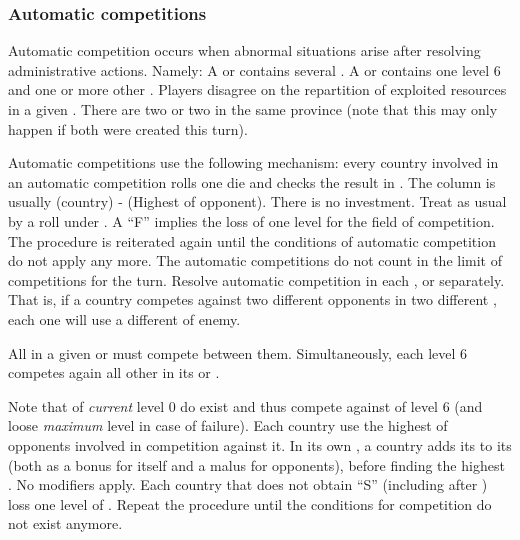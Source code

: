 \subsubsection{Automatic competitions}
\label{chExpenses:Automatic Competition}
\aparag[Conditions] Automatic competition occurs when abnormal situations
arise after resolving administrative actions. Namely:
\bparag A \STZ or \CTZ contains several \TradeFLEET\faceplus.
\bparag A \STZ or \CTZ contains one level 6 \TradeFLEET and one or more other
\TradeFLEET.
\bparag Players disagree on the repartition of exploited resources in a given
\Area.
\bparag There are two \COL or two \TP in the same province (note that this may
only happen if both were created this turn).

\aparag[Mechanism] Automatic competitions use the following mechanism: every
country involved in an automatic competition rolls one die and checks the
result in .
\bparag The column is usually (\FTI country) - (Highest \FTI of
opponent). There is no investment.
\bparag Treat \undemi as usual by a roll under \FTI.
\bparag A ``F'' implies the loss of one level for the field of competition.
\bparag The procedure is reiterated again until the conditions of automatic
competition do not apply any more.
\bparag The automatic competitions do not count in the limit of competitions
for the turn.
\bparag Resolve automatic competition in each \STZ, \CTZ or \Area
separately. That is, if a country competes against two different opponents in
two different \STZ, each one will use a different \FTI of enemy.

\aparag[Fleets]\label{chExpenses:Trade Competition Mandatory}
All \TradeFLEET\faceplus in a given \STZ or \CTZ must compete between
them. Simultaneously, each level 6 \TradeFLEET competes again all other
\TradeFLEET in its \STZ or \CTZ.


\bparag Note that \TradeFLEET of \emph{current} level 0 do exist and thus
compete against \TradeFLEET of level 6 (and loose \emph{maximum} level in case
of failure).
\bparag Each country use the highest \FTI of opponents involved in competition
against it.
\bparag In its own \CTZ, a country adds its \DTI to its \FTI (both as a bonus
for itself and a malus for opponents), before finding the highest \FTI.
\bparag No modifiers apply.
\bparag Each country that does not obtain ``S'' (including after \undemi) loss
one level of \TradeFLEET.
\bparag Repeat the procedure until the conditions for competition do not exist
anymore.

